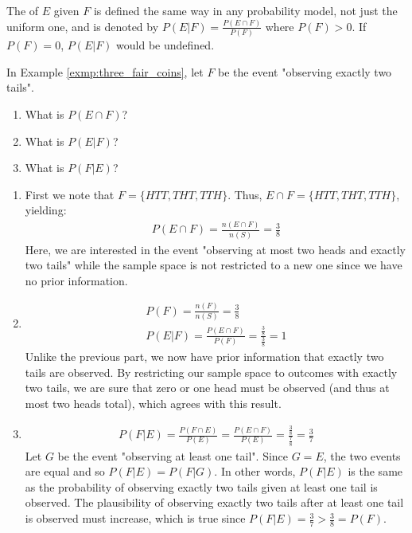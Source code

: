 The  of \( E \) given \( F \) is defined the same way in any probability model, not just the uniform one, and is denoted by \( P(E | F) = \frac{P(E \cap F)}{P(F)} \)
where \( P(F) > 0 \).
If \( P(F) = 0 \), \( P(E | F) \) would be undefined.

\begin{exmp}
	In Example \autoref{exmp:three_fair_coins}, let \( F \) be the event "observing exactly two tails".
	\begin{enumerate}
		\item What is \( P(E \cap F) \)?
		\item What is \( P(E | F) \)?
		\item What is \( P(F | E) \)?
	\end{enumerate}
\end{exmp}
\begin{solution}
	\begin{enumerate}
		\item First we note that \( F = \{ HTT, THT, TTH \} \).
		Thus, \( E \cap F = \{ HTT, THT, TTH \} \), yielding:
		\begin{align*}
			P(E \cap F) = \frac{n(E \cap F)}{n(S)} = \frac{3}{8}
		\end{align*}
		Here, we are interested in the event "observing at most two heads and exactly two tails" while the sample space is not restricted to a new one since we have no prior information.
		\item \begin{gather*}
			P(F) = \frac{n(F)}{n(S)} = \frac{3}{8}\\
			P(E | F) = \frac{P(E \cap F)}{P(F)} = \frac{\frac{3}{8}}{\frac{3}{8}} = 1
		\end{gather*}
		Unlike the previous part, we now have prior information that exactly two tails are observed. 
		By restricting our sample space to outcomes with exactly two tails, we are sure that zero or one head must be observed (and thus at most two heads total), which agrees with this result.
		\item \begin{gather*}
			P(F | E) = \frac{P(F \cap E)}{P(E)} = \frac{P(E \cap F)}{P(E)} = \frac{\frac{3}{8}}{\frac{7}{8}} = \frac{3}{7}
		\end{gather*}
		Let \( G \) be the event "observing at least one tail".
		Since \( G = E \), the two events are equal and so \( P(F | E) = P(F | G) \).
		In other words, \( P(F | E) \) is the same as the probability of observing exactly two tails given at least one tail is observed.
		The plausibility of observing exactly two tails after at least one tail is observed must increase,
		which is true since \( P(F | E) = \frac{3}{7} > \frac{3}{8} = P(F) \).
	\end{enumerate}
\end{solution}

